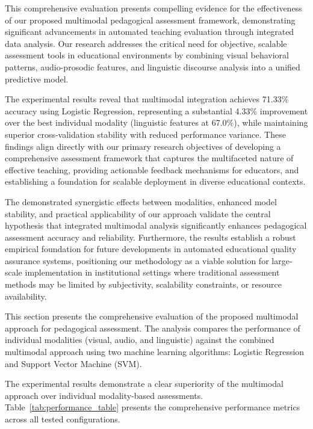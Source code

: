 
This comprehensive evaluation presents compelling evidence for the effectiveness of our proposed multimodal pedagogical assessment framework, demonstrating significant advancements in automated teaching evaluation through integrated data analysis. Our research addresses the critical need for objective, scalable assessment tools in educational environments by combining visual behavioral patterns, audio-prosodic features, and linguistic discourse analysis into a unified predictive model. 

The experimental results reveal that multimodal integration achieves 71.33\% accuracy using Logistic Regression, representing a substantial 4.33\% improvement over the best individual modality (linguistic features at 67.0\%), while maintaining superior cross-validation stability with reduced performance variance. These findings align directly with our primary research objectives of developing a comprehensive assessment framework that captures the multifaceted nature of effective teaching, providing actionable feedback mechanisms for educators, and establishing a foundation for scalable deployment in diverse educational contexts.

The demonstrated synergistic effects between modalities, enhanced model stability, and practical applicability of our approach validate the central hypothesis that integrated multimodal analysis significantly enhances pedagogical assessment accuracy and reliability. Furthermore, the results establish a robust empirical foundation for future developments in automated educational quality assurance systems, positioning our methodology as a viable solution for large-scale implementation in institutional settings where traditional assessment methods may be limited by subjectivity, scalability constraints, or resource availability.

This section presents the comprehensive evaluation of the proposed multimodal approach for pedagogical assessment. The analysis compares the performance of individual modalities (visual, audio, and linguistic) against the combined multimodal approach using two machine learning algorithms: Logistic Regression and Support Vector Machine (SVM).

The experimental results demonstrate a clear superiority of the multimodal approach over individual modality-based assessments. Table~\ref{tab:performance_table} presents the comprehensive performance metrics across all tested configurations.


